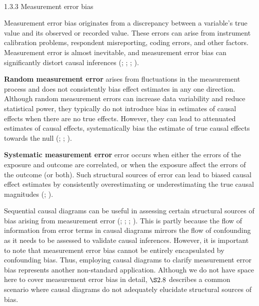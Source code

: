 \documentclass[
  singlecolumn]{article}
\makeatletter
\let\oldparagraph\paragraph
\renewcommand{\paragraph}{
    \@ifstar
      \xxxParagraphStar
      \xxxParagraphNoStar
  }
\newcommand{\xxxParagraphStar}[1]{\oldparagraph*{#1}\mbox{}}
\newcommand{\xxxParagraphNoStar}[1]{\oldparagraph{#1}\mbox{}}
\makeatother
\begin{document}
\paragraph{1.3.3 Measurement error bias}\label{measurement-error-bias}

Measurement error bias originates from a discrepancy between a
variable's true value and its observed or recorded value. These errors
can arise from instrument calibration problems, respondent misreporting,
coding errors, and other factors. Measurement error is almost
inevitable, and measurement error bias can significantly distort causal
inferences (;
;
;
).

\textbf{Random measurement error} arises from fluctuations in the
measurement process and does not consistently bias effect estimates in
any one direction. Although random measurement errors can increase data
variability and reduce statistical power, they typically do not
introduce bias in estimates of causal effects when there are no true
effects. However, they can lead to attenuated estimates of causal
effects, systematically bias the estimate of true causal effects towards
the null (;
;
).

\textbf{Systematic measurement error} error occurs when either the
errors of the exposure and outcome are correlated, or when the exposure
affect the errors of the outcome (or both). Such structural sources of
error can lead to biased causal effect estimates by consistently
overestimating or underestimating the true causal magnitudes
(;
).

Sequential causal diagrams can be useful in assessing certain structural
sources of bias arising from measurement error
(;
;
;
). This is
partly because the flow of information from error terms in causal
diagrams mirrors the flow of confounding as it needs to be assessed to
validate causal inferences. However, it is important to note that
measurement error bias cannot be entirely encapsulated by confounding
bias. Thus, employing causal diagrams to clarify measurement error bias
represents another non-standard application. Although we do not have
space here to cover measurement error bias in detail, \(\S 2.8\)
describes a common scenario where causal diagrams do not adequately
elucidate structural sources of bias.
\end{document}

